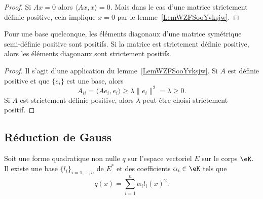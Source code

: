 \begin{proof}
	Si \( Ax=0\) alors \( \langle Ax, x\rangle =0\). Mais dans le cas d'une matrice strictement définie positive, cela implique \( x=0\) par le lemme~\ref{LemWZFSooYvksjw}.
\end{proof}

\begin{lemma}
	Pour une base quelconque, les éléments diagonaux d'une matrice symétrique semi-définie positive sont positifs. Si la matrice est strictement définie positive, alors les éléments diagonaux sont strictement positifs.
\end{lemma}

\begin{proof}
	Il s'agit d'une application du lemme~\ref{LemWZFSooYvksjw}. Si \( A\) est définie positive et que \( \{ e_i \}\) est une base, alors
	\begin{equation}
		A_{ii}=\langle Ae_i, e_i\rangle \geq \lambda\| e_i \|^2=\lambda\geq 0.
	\end{equation}
	Si \( A\) est strictement définie positive, alors \( \lambda\) peut être choisi strictement positif.
\end{proof}

\subsection{Réduction de Gauss}

\begin{theorem}     \label{THOooOMMFooKxqICS}
	Soit une forme quadratique non nulle \( q\) sur l'espace vectoriel \( E\) sur le corps \( \eK\). Il existe une base  \(\{ l_i \}_{i=1,\ldots, n}\) de \( E^*\) et des coefficients \( \alpha_i\in \eK\) tels que
	\begin{equation}
		q(x)=\sum_{i=1}^n\alpha_il_i(x)^2.
	\end{equation}
\end{theorem}

